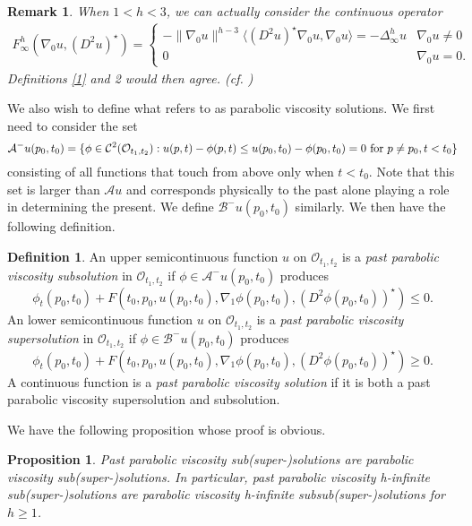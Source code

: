 \documentclass[12pt]{amsart}
\newtheorem{prop}[thm]{Proposition}
\newtheorem{remark}[thm]{Remark}
\theoremstyle{definition}
\newtheorem{definition}{Definition}
\theoremstyle{remark}
\numberwithin{equation}{section}
\begin{document}
\begin{remark}
When $1<h<3$, we can actually consider the continuous operator 
\begin{eqnarray}\label{relax}
F^h_\infty(\nabla_0 u,(D^2u)^{\star}) = 
\left\{\begin{array}{cl}
-\|\nabla_0u\|^{h-3}{\ensuremath{\langle {(D^2u)^{\star}\nabla_0u} , {\nabla_0u} \rangle}}=-\Delta^h_\infty u & \nabla_0u \neq 0 \\
0 & \nabla_0u = 0. \end{array}\right.
\end{eqnarray}
Definitions \ref{1} and {2} would then agree. (cf. \cite{PV})
\end{remark}
 

We also wish to define what \cite{J:PD} refers to as parabolic viscosity solutions. We first need to consider the set $$\mathcal{A}^-u(p_0,t_0)=\{\phi \in \mathcal{C}^2(\mathcal{O}_{t_1,t_2}): u(p,t)-\phi(p,t) \leq u(p_0,t_0)-\phi(p_0,t_0)=0\  \textmd{for}\ p \neq p_0, t < t_0\}$$ 
consisting of all functions that touch from above only when $t<t_0$.  
Note that this set is larger than $\mathcal{A}u$ and corresponds physically to the past alone playing a role in determining the present. We define $\mathcal{B}^-u(p_0,t_0)$ similarly.
We then have the following definition.

\begin{definition}
An upper semicontinuous function $u$ on $\mathcal{O}_{t_1,t_2}$ is a \emph{past parabolic viscosity subsolution} in $\mathcal{O}_{t_1,t_2}$ if $\phi\in \mathcal{A}^-u(p_0,t_0)$ produces 
$$\phi_t(p_0,t_0)+F(t_0,p_0,u(p_0,t_0),\nabla_1 \phi(p_0,t_0),(D^2\phi(p_0,t_0))^{\star}) \leq 0.$$ 
An lower semicontinuous function $u$ on $\mathcal{O}_{t_1,t_2}$ is a \emph{past parabolic viscosity supersolution} in $\mathcal{O}_{t_1,t_2}$ if $\phi\in \mathcal{B}^-u(p_0,t_0)$ produces 
$$\phi_t(p_0,t_0)+F(t_0,p_0,u(p_0,t_0),\nabla_1 \phi(p_0,t_0),(D^2\phi(p_0,t_0))^{\star}) \geq 0.$$ 
A continuous function is a \emph{past parabolic viscosity solution} if it is both a past parabolic viscosity supersolution and subsolution.
\end{definition} 
We have the following proposition whose proof is obvious. 
\begin{prop}\label{onedir}
Past parabolic viscosity sub(super-)solutions are parabolic viscosity sub(super-)solutions. In particular, past parabolic viscosity h-infinite sub(super-)solutions are parabolic viscosity h-infinite subsub(super-)solutions for $h \geq 1$. 
\end{prop}
\end{document}
